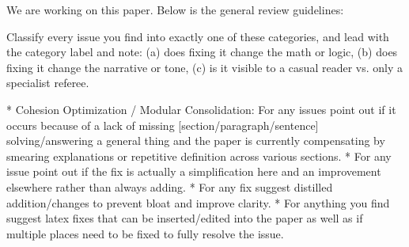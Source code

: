 We are working on this paper.  Below is the general review guidelines:

Classify every issue you find into exactly one of these categories, and lead with the category label and note: (a) does fixing it change the math or logic, (b) does fixing it change the narrative or tone, (c) is it visible to a casual reader vs. only a specialist referee.

* Cohesion Optimization / Modular Consolidation: For any issues point out if it occurs because of a lack of missing [section/paragraph/sentence] solving/answering a general thing and the paper is currently compensating by smearing explanations or repetitive definition across various sections.
* For any issue point out if the fix is actually a simplification here and an improvement elsewhere rather than always adding.
* For any fix suggest distilled addition/changes to prevent bloat and improve clarity.
* For anything you find suggest latex fixes that can be inserted/edited into the paper as well as if multiple places need to be fixed to fully resolve the issue.


